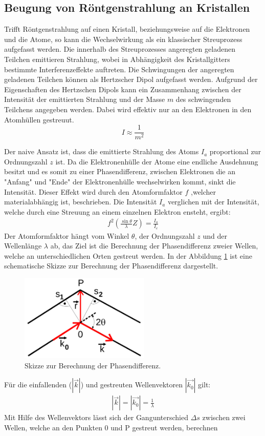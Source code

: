 \subsection{Beugung von Röntgenstrahlung an Kristallen}
Trifft Röntgenstrahlung auf einen Kristall, beziehungsweise auf die Elektronen
und die Atome, so kann die Wechselwirkung  als ein klassischer Streuprozess
aufgefasst werden. Die innerhalb des Streuprozesses angeregten geladenen
Teilchen emittieren Strahlung, wobei in Abhängigkeit des Kristallgitters
bestimmte Interferenzeffekte auftreten. Die Schwingungen der angeregten
geladenen Teilchen können als Hertzscher Dipol aufgefasst werden.
Aufgrund der Eigenschaften des Hertzschen Dipols kann ein
Zusammenhang zwischen der Intensität der emittierten Strahlung und
der Masse $m$ des schwingenden Teilchens angegeben werden.
Dabei wird effektiv nur an den Elektronen in den Atomhüllen gestreuut.
$$I \approx \frac{1}{m^2}$$

Der naive Ansatz ist, dass die emittierte Strahlung des
Atoms $I_a$ proportional zur Ordnungszahl $z$ ist.
Da die Elektronenhülle der Atome eine endliche Ausdehnung besitzt und
es somit zu einer Phasendifferenz, zwischen Elektronen die an
"Anfang" und "Ende" der Elektronenhülle wechselwirken kommt,  sinkt die
Intensität. Dieser Effekt wird durch den Atomformfaktor $f$ ,welcher
materialabhängig ist, beschrieben. Die Intensität $I_a$ verglichen mit
der Intensität, welche durch eine Streuung an einem einzelnen Elektron ensteht,
ergibt:
\begin{align}
    f^2\left( \frac{\sin \theta}{\lambda}Z \right)=\frac{I_a}{I_e}
    \label{atom}
\end{align}
Der Atomformfaktor hängt vom Winkel $\theta$, der Ordnungszahl $z$ und der
Wellenlänge $\lambda$ ab, das Ziel ist die Berechnung der Phasendifferenz zweier
Wellen, welche an unterschiedlichen Orten gestreut werden.
In der Abbildung \ref{bragg} ist eine schematische Skizze zur
Berechnung der Phasendifferenz dargestellt.
\begin{figure}
    \centering
    \includegraphics[width=0.55\textwidth]{ressources/bragg.png}
    \caption{Skizze zur Berechnung der Phasendifferenz\cite{skript}.}
    \label{bragg}
\end{figure}
Für die einfallenden ($|\vec{k}|$) und gestreuten Wellenvektoren $|\vec{k_0}|$ gilt:
\begin{align}
|\vec{k}|=|\vec{k_0}|=\frac{1}{\lambda}
    \label{welle}
\end{align}
Mit Hilfe des Wellenvektors lässt sich der Gangunterschied $\Delta s$ zwischen
zwei Wellen, welche an den Punkten 0 und P gestreut werden, berechnen

